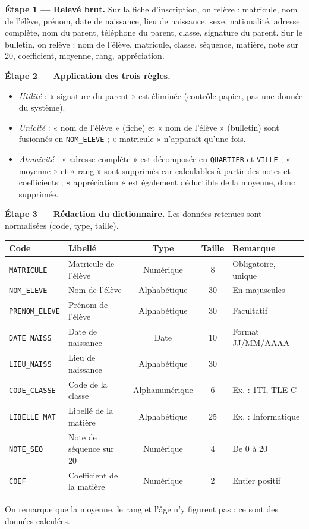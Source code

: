 \documentclass[11pt]{article}
\begin{document}
\textbf{Étape 1 — Relevé brut.} Sur la fiche d'inscription, on relève : matricule, nom de l'élève, prénom, date de naissance, lieu de naissance, sexe, nationalité, adresse complète, nom du parent, téléphone du parent, classe, signature du parent. Sur le bulletin, on relève : nom de l'élève, matricule, classe, séquence, matière, note sur 20, coefficient, moyenne, rang, appréciation.

\textbf{Étape 2 — Application des trois règles.}
\begin{itemize}
  \item \emph{Utilité} : « signature du parent » est éliminée (contrôle papier, pas une donnée du système).
  \item \emph{Unicité} : « nom de l'élève » (fiche) et « nom de l'élève » (bulletin) sont fusionnés en \texttt{NOM\_ELEVE} ; « matricule » n'apparaît qu'une fois.
  \item \emph{Atomicité} : « adresse complète » est décomposée en \texttt{QUARTIER} et \texttt{VILLE} ; « moyenne » et « rang » sont supprimés car calculables à partir des notes et coefficients ; « appréciation » est également déductible de la moyenne, donc supprimée.
\end{itemize}

\textbf{Étape 3 — Rédaction du dictionnaire.} Les données retenues sont normalisées (code, type, taille).

\begin{exemplebox}
\begin{center}
\begin{tabularx}{\linewidth}{|l|X|c|c|X|}
\hline
\rowcolor{popblueL}\textbf{Code} & \textbf{Libellé} & \textbf{Type} & \textbf{Taille} & \textbf{Remarque} \\
\hline
\texttt{MATRICULE} & Matricule de l'élève & Numérique & 8 & Obligatoire, unique \\
\hline
\texttt{NOM\_ELEVE} & Nom de l'élève & Alphabétique & 30 & En majuscules \\
\hline
\texttt{PRENOM\_ELEVE} & Prénom de l'élève & Alphabétique & 30 & Facultatif \\
\hline
\texttt{DATE\_NAISS} & Date de naissance & Date & 10 & Format JJ/MM/AAAA \\
\hline
\texttt{LIEU\_NAISS} & Lieu de naissance & Alphabétique & 30 & \\
\hline
\texttt{CODE\_CLASSE} & Code de la classe & Alphanumérique & 6 & Ex. : 1TI, TLE C \\
\hline
\texttt{LIBELLE\_MAT} & Libellé de la matière & Alphabétique & 25 & Ex. : Informatique \\
\hline
\texttt{NOTE\_SEQ} & Note de séquence sur 20 & Numérique & 4 & De 0 à 20 \\
\hline
\texttt{COEF} & Coefficient de la matière & Numérique & 2 & Entier positif \\
\hline
\end{tabularx}
\end{center}
On remarque que la moyenne, le rang et l'âge n'y figurent pas : ce sont des données calculées.
\end{exemplebox}
\end{document}
